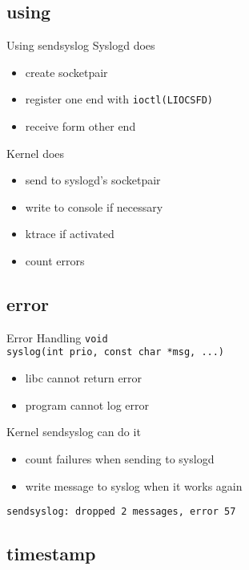 \documentclass[14pt]{beamer}
\begin{document}
\subsection{using}

\begin{frame}{Using sendsyslog}
    Syslogd does
\begin{itemize}
    \item create socketpair
    \item register one end with \texttt{ioctl(LIOCSFD)}
    \item receive form other end
\end{itemize}
    \vspace{.5cm}
    Kernel does
\begin{itemize}
    \item send to syslogd's socketpair
    \item write to console if necessary
    \item ktrace if activated
    \item count errors
\end{itemize}
\end{frame}

\subsection{error}

\begin{frame}{Error Handling}
    \texttt{void \\
	syslog(int prio, const char *msg, ...)}
\begin{itemize}
    \item libc cannot return error
    \item program cannot log error
\end{itemize}
    \vspace{.5cm}
    Kernel sendsyslog can do it
\begin{itemize}
    \item count failures when sending to syslogd
    \item write message to syslog when it works again
\end{itemize}
    \vspace{.5cm}
    \texttt{sendsyslog:\ dropped 2 messages, error 57}
\end{frame}

\subsection{timestamp}
\end{document}
